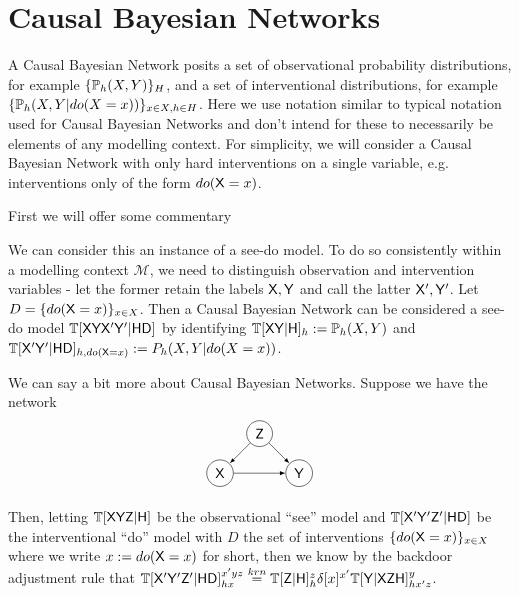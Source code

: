 

\section{Causal Bayesian Networks}\label{sec:CBN}

A Causal Bayesian Network posits a set of observational probability distributions, for example $\{\mathbb{P}_h(X,Y)\}_H$, and a set of interventional distributions, for example $\{\mathbb{P}_h(X,Y|do(X=x))\}_{x\in X,h\in H}$. Here we use notation similar to typical notation used for Causal Bayesian Networks and don't intend for these to necessarily be elements of any modelling context. For simplicity, we will consider a Causal Bayesian Network with only hard interventions on a single variable, e.g. interventions only of the form $do(\mathsf{X}=x)$.

First we will offer some commentary



We can consider this an instance of a see-do model. To do so consistently within a modelling context $\mathscr{M}$, we need to distinguish observation and intervention variables - let the former retain the labels $\mathsf{X},\mathsf{Y}$ and call the latter $\mathsf{X}',\mathsf{Y}'$. Let $D=\{do(\mathsf{X}=x)\}_{x\in X}$. Then a Causal Bayesian Network can be considered a see-do model $\mathbb{T}[\mathsf{XYX'Y'}|\mathsf{HD}]$ by identifying $\mathbb{T}[\mathsf{XY}|\mathsf{H}]_h := \mathbb{P}_h(X,Y)$ and $\mathbb{T}[\mathsf{X'Y'}|\mathsf{HD}]_{h,do(\mathsf{X}=x)}:={P}_h(X,Y|do(X=x))$.


We can say a bit more about Causal Bayesian Networks. Suppose we have the network
\begin{align*}
\begin{tikzpicture}
    \path (0,0) node[draw,circle] (X) {$\RV{X}$}
    ++ (1,1) node[draw,circle] (Z) {$\RV{Z}$}
    ++ (1,-1) node[draw, circle] (Y) {$\RV{Y}$};
    \draw[-latex] (X)--(Y);
    \draw[-latex] (Z) -- (Y);
    \draw[-latex] (Z) -- (X);
\end{tikzpicture}
\end{align*}

Then, letting $\mathbb{T}[\mathsf{XYZ}|\mathsf{H}]$ be the observational ``see'' model and $\mathbb{T}[\mathsf{X'Y'Z'}|\mathsf{HD}]$ be the interventional ``do'' model with $D$ the set of interventions $\{do(\mathsf{X}=x)\}_{x\in X}$ where we write $x:=do(\mathsf{X}=x)$ for short, then we know by the backdoor adjustment rule that $\mathbb{T}[\mathsf{X'Y'Z'}|\mathsf{HD}]_{hx}^{x'yz} \overset{krn}{=} \mathbb{T}[\mathsf{Z}|\mathsf{H}]_h^z \delta[x]^{x'} \mathbb{T}[\mathsf{Y}|\mathsf{XZH}]_{hx'z}^y$. 

